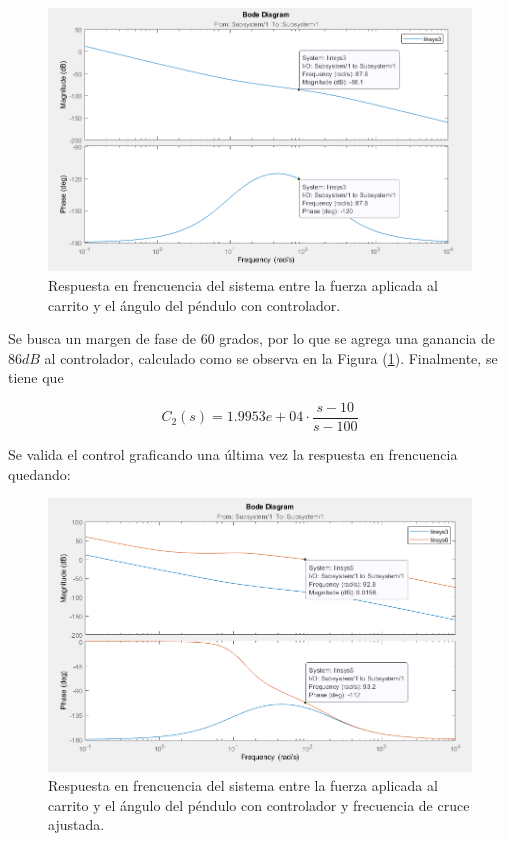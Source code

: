 \begin{figure}[H]
	\centering
	\includegraphics[width=0.8\linewidth]{Imagenes/loopshaping/bode_cerrando_q_con_controlador}
	\caption{Respuesta en frencuencia del sistema entre la fuerza aplicada al carrito y el ángulo del péndulo con controlador.}
	\label{bode_cerrando_q_con_controlador}
\end{figure}

Se busca un margen de fase de $60$ grados, por lo que se agrega una ganancia de $86 dB$ al controlador, calculado como se observa en la Figura (\ref{bode_cerrando_q_con_controlador}). Finalmente, se tiene que

\begin{equation}
C_2(s) = 1.9953e+04 \cdot \frac{s-10}{s-100}
\end{equation}

Se valida el control graficando una última vez la respuesta en frencuencia quedando:

\begin{figure}[H]
	\centering
	\includegraphics[width=0.8\linewidth]{Imagenes/loopshaping/bode_cerrando_q_con_controlador_ganancia}
	\caption{Respuesta en frencuencia del sistema entre la fuerza aplicada al carrito y el ángulo del péndulo con controlador y frecuencia de cruce ajustada.}
	\label{bode_cerrando_q_con_controlador_ganancia}
\end{figure}

